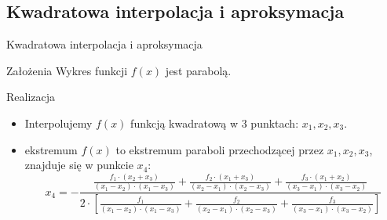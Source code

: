 
\subsection{Kwadratowa interpolacja i aproksymacja}
  \begin{frame}{Kwadratowa interpolacja i aproksymacja}
    \begin{block}{Założenia}
      Wykres funkcji $f(x)$ jest parabolą.
    \end{block}
    \begin{block}{Realizacja}
      \begin{itemize}
        \item Interpolujemy $f(x)$ funkcją kwadratową w 3 punktach: $x_{1}{, }x_{2}{, }x_{3}$.
        \item ekstremum $f(x) $ to ekstremum paraboli przechodzącej przez
        $x_{1}{, }x_{2}{, }x_{3}$, znajduje się w punkcie $x_4$:
        \begin{displaymath}
          x_4 = - \frac{
            \frac{f_{1}\cdot(x_{2}+x_{3})}{(x_{1}-x_{2})\cdot(x_{1}-x_{3})} +
            \frac{f_{2}\cdot(x_{1}+x_{3})}{(x_{2}-x_{1})\cdot(x_{2}-x_{3})} +
            \frac{f_{3}\cdot(x_{1}+x_{2})}{(x_{3}-x_{1})\cdot(x_{3}-x_{2})}
          }{2 \cdot \left[
            \frac{f_{1}}{(x_{1}-x_{2})\cdot(x_{1}-x_{3})} +
            \frac{f_{2}}{(x_{2}-x_{1})\cdot(x_{2}-x_{3})} +
            \frac{f_{3}}{(x_{3}-x_{1})\cdot(x_{3}-x_{2})}
          \right]}
        \end{displaymath}
      \end{itemize}
    \end{block}
  \end{frame}

